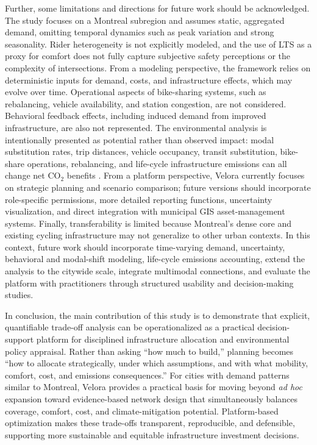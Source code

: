 \documentclass[preprint,authoryear,10pt]{elsarticle}
\begin{document}
Further, some limitations and directions for future work should be acknowledged. The study focuses on a Montreal subregion and assumes static, aggregated demand, omitting temporal dynamics such as peak variation and strong seasonality. Rider heterogeneity is not explicitly modeled, and the use of LTS as a proxy for comfort does not fully capture subjective safety perceptions or the complexity of intersections. From a modeling perspective, the framework relies on deterministic inputs for demand, costs, and infrastructure effects, which may evolve over time. Operational aspects of bike-sharing systems, such as rebalancing, vehicle availability, and station congestion, are not considered. Behavioral feedback effects, including induced demand from improved infrastructure, are also not represented. The environmental analysis is intentionally presented as potential rather than observed impact: modal substitution rates, trip distances, vehicle occupancy, transit substitution, bike-share operations, rebalancing, and life-cycle infrastructure emissions can all change net CO$_2$ benefits \citep{RICCI201528, saltykova2022environmental}. From a platform perspective, Velora currently focuses on strategic planning and scenario comparison; future versions should incorporate role-specific permissions, more detailed reporting functions, uncertainty visualization, and direct integration with municipal GIS asset-management systems. Finally, transferability is limited because Montreal's dense core and existing cycling infrastructure may not generalize to other urban contexts. In this context, future work should incorporate time-varying demand, uncertainty, behavioral and modal-shift modeling, life-cycle emissions accounting, extend the analysis to the citywide scale, integrate multimodal connections, and evaluate the platform with practitioners through structured usability and decision-making studies.

In conclusion, the main contribution of this study is to demonstrate that explicit, quantifiable trade-off analysis can be operationalized as a practical decision-support platform for disciplined infrastructure allocation and environmental policy appraisal. Rather than asking ``how much to build,'' planning becomes ``how to allocate strategically, under which assumptions, and with what mobility, comfort, cost, and emissions consequences.'' For cities with demand patterns similar to Montreal, Velora provides a practical basis for moving beyond \textit{ad hoc} expansion toward evidence-based network design that simultaneously balances coverage, comfort, cost, and climate-mitigation potential. Platform-based optimization makes these trade-offs transparent, reproducible, and defensible, supporting more sustainable and equitable infrastructure investment decisions.
\end{document}
